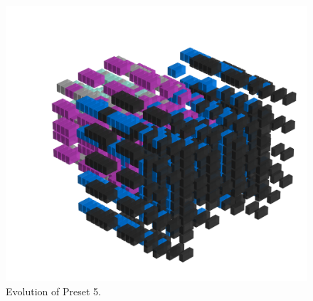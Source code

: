 \clearpage                                                                 
\begin{figure}[H]                                                          
  \centering                                                             
  \begin{adjustbox}{width=14cm,center}                                   
  \includegraphics[width=14cm]{src/presets/pattern5-45.png}%
  \end{adjustbox}                                                        
\caption{Evolution of Preset 5.}                                           
\end{figure}                                                               
\clearpage                                                                 
                                                                           
